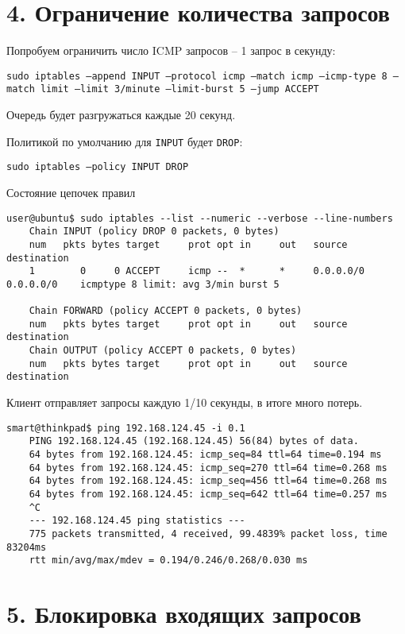 \section*{4. Ограничение количества запросов}

Попробуем ограничить число ICMP запросов -- 1 запрос в секунду:

\texttt{sudo iptables --append INPUT --protocol icmp --match icmp --icmp-type 8 --match limit --limit 3/minute --limit-burst 5 --jump ACCEPT}

Очередь будет разгружаться каждые 20 секунд.

Политикой по умолчанию для \texttt{INPUT} будет \texttt{DROP}:

\texttt{sudo iptables --policy INPUT DROP}

Состояние цепочек правил
\begin{Verbatim}[frame=single,breaklines=true,breakanywhere=true]
    user@ubuntu$ sudo iptables --list --numeric --verbose --line-numbers
    Chain INPUT (policy DROP 0 packets, 0 bytes)
    num   pkts bytes target     prot opt in     out   source       destination
    1        0     0 ACCEPT     icmp --  *      *     0.0.0.0/0    0.0.0.0/0    icmptype 8 limit: avg 3/min burst 5

    Chain FORWARD (policy ACCEPT 0 packets, 0 bytes)
    num   pkts bytes target     prot opt in     out   source       destination
    Chain OUTPUT (policy ACCEPT 0 packets, 0 bytes)
    num   pkts bytes target     prot opt in     out   source       destination
\end{Verbatim}

Клиент отправляет запросы каждую 1/10 секунды, в итоге много потерь.
\begin{Verbatim}[frame=single,breaklines=true,breakanywhere=true]
    smart@thinkpad$ ping 192.168.124.45 -i 0.1
    PING 192.168.124.45 (192.168.124.45) 56(84) bytes of data.
    64 bytes from 192.168.124.45: icmp_seq=84 ttl=64 time=0.194 ms
    64 bytes from 192.168.124.45: icmp_seq=270 ttl=64 time=0.268 ms
    64 bytes from 192.168.124.45: icmp_seq=456 ttl=64 time=0.268 ms
    64 bytes from 192.168.124.45: icmp_seq=642 ttl=64 time=0.257 ms
    ^C
    --- 192.168.124.45 ping statistics ---
    775 packets transmitted, 4 received, 99.4839% packet loss, time 83204ms
    rtt min/avg/max/mdev = 0.194/0.246/0.268/0.030 ms
\end{Verbatim}

\section*{5. Блокировка входящих запросов}

